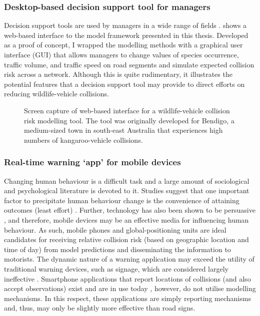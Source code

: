 \subsubsection{Desktop-based decision support tool for managers}

Decision support tools are used by managers in a wide range of fields \citep{shim02}.  shows a web-based interface to the model framework presented in this thesis. Developed as a proof of concept, I wrapped the modelling methods with a graphical user interface (GUI) that allows managers to change values of species occurrence, traffic volume, and traffic speed on road segments and simulate expected collision risk across a network. Although this is quite rudimentary, it illustrates the potential features that a decision support tool may provide to direct efforts on reducing wildlife-vehicle collisions.

\begin{figure*}[!t]
  \centering
  \caption[Decision support tool for wildlife-vehicle collisions]{Screen capture of web-based interface for a wildlife-vehicle collision risk modelling tool. The tool was originally developed for Bendigo, a medium-sized town in south-east Australia that experiences high numbers of kangaroo-vehicle collisions.}
  \label{wvc_tool}
\end{figure*}

\subsubsection{Real-time warning `app' for mobile devices}

Changing human behaviour is a difficult task and a large amount of sociological and psychological literature is devoted to it. Studies suggest that one important factor to precipitate human behaviour change is the convenience of attaining outcomes (least effort) \citep{zipf49}. Further, technology has also been shown to be persuasive \citep{fogg03,lath13}, and therefore, mobile devices may be an effective media for influencing human behaviour. As such, mobile phones and global-positioning units are ideal candidates for receiving relative collision risk (based on geographic location and time of day) from model predictions and disseminating the information to motorists. The dynamic nature of a warning application may exceed the utility of traditional warning devices, such as signage, which are considered largely ineffective \citep{bond13}.  Smartphone applications that report locations of collisions (and also accept observations) exist and are in use today \citep{aane09}, however, do not utilise modelling mechanisms. In this respect, these applications are simply reporting mechanisms and, thus, may only be slightly more effective than road signs.  

